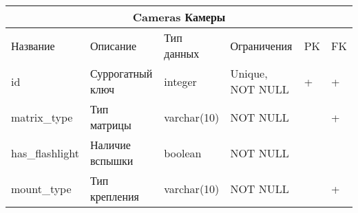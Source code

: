 \documentclass{article}
\begin{document}
\begin{tabular}{ |p{4.5cm}|p{4cm}|p{3cm}|p{3cm}|p{2cm}|p{1cm}| }
\hline
\multicolumn{6}{|c|}{Cameras Камеры} \\
\hline
Название & Описание & Тип данных & Ограничения & PK & FK\\
\hline
id                                  &   %
Суррогатный ключ                    &   %
integer                             &   %
Unique, NOT NULL                    &   %
 +                                  &   %
 +                                  \\  %
\hline
matrix\_type                        &   %
Тип матрицы                         &   %
varchar(10)                         &   %
NOT NULL                            &   %
                                    &   %
 +                                  \\  %
\hline
has\_flashlight                     &   %
Наличие вспышки                     &   %
boolean                             &   %
NOT NULL                            &   %
                                    &   %
                                    \\  %
\hline
mount\_type                         &   %
Тип крепления                       &   %
varchar(10)                         &   %
NOT NULL                            &   %
                                    &   %
 +                                  \\  %
\hline
\end{tabular}
\end{document}
